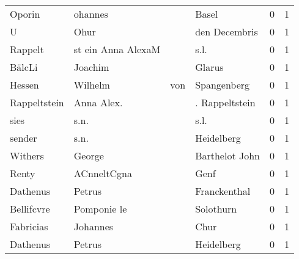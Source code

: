 \begin{tabular}{llllrr}
                   Oporin &                            ohannes &             &                                       Basel &          0 &         1 \\
                        U &                               Ohur &             &                               den Decembris &          0 &         1 \\
                  Rappelt &                 st ein Anna AlexaM &             &                                        s.l. &          0 &         1 \\
                   BälcLi &                            Joachim &             &                                      Glarus &          0 &         1 \\
                   Hessen &                            Wilhelm &         von &                                 Spangenberg &          0 &         1 \\
             Rappeltstein &                         Anna Alex. &             &                              . Rappeltstein &          0 &         1 \\
                     sies &                               s.n. &             &                                        s.l. &          0 &         1 \\
                   sender &                               s.n. &             &                                  Heidelberg &          0 &         1 \\
                  Withers &                             George &             &                              Barthelot John &          0 &         1 \\
                    Renty &                        ACnneltCgna &             &                                        Genf &          0 &         1 \\
                 Dathenus &                             Petrus &             &                                Franckenthal &          0 &         1 \\
               Bellifcvre &                        Pomponie le &             &                                   Solothurn &          0 &         1 \\
                Fabricias &                           Johannes &             &                                        Chur &          0 &         1 \\
                 Dathenus &                             Petrus &             &                                  Heidelberg &          0 &         1 \\

\end{tabular}
